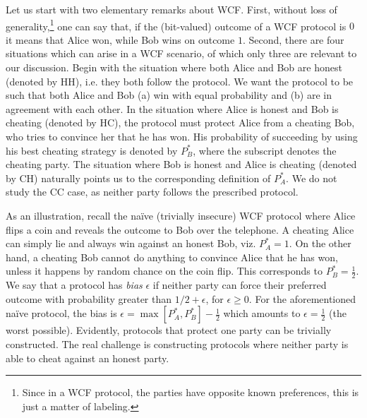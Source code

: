 \documentclass{article}
\begin{document}
Let us start with two elementary remarks about WCF.
%
First, without loss of generality,\footnote{Since in a WCF protocol, the parties have opposite known preferences, this is just a matter of labeling.} one can say that, if
the (bit-valued) outcome of a WCF protocol is $0$ %
it means that Alice won, while Bob wins on outcome $1$. Second, there are four situations which can arise
in a WCF scenario, of which only three are relevant to our discussion. %
Begin with the situation where both Alice and Bob are honest (denoted by HH),
i.e. they both follow the protocol. We want the protocol to
be such that both Alice and Bob (a) win with equal probability and
(b) are in agreement with each other. In the situation where Alice
is honest and Bob is cheating (denoted by HC), the protocol must protect Alice from
a cheating Bob, who tries to convince
her that he has won. His probability of succeeding by
using his best cheating strategy is denoted by $P_{B}^{*}$, where the subscript denotes
the cheating party. The situation
where Bob is honest and Alice is cheating (denoted by CH) naturally points us to the
corresponding definition of $P_{A}^{*}$.  We do not study the CC case, as neither party follows the prescribed protocol.

As an illustration, recall the naïve (trivially insecure) WCF protocol where Alice
flips a coin and reveals the outcome to Bob over the telephone. A cheating
Alice can simply lie and always win against an honest Bob, viz. $P_{A}^{*}=1$. On the other hand, a cheating Bob cannot do anything
to convince Alice that he has won, unless it happens by random chance
on the coin flip. This corresponds to $P_{B}^{*}=\frac{1}{2}$. We say that a protocol has \emph{bias} $\epsilon$ if neither party can force their preferred outcome with probability greater than $1/2+\epsilon$, for $\epsilon\geq 0$. For the aforementioned naïve protocol, the bias is $\epsilon=\max[P_{A}^{*},P_{B}^{*}]-\frac{1}{2}$ which
amounts to $\epsilon=\frac{1}{2}$ (the worst possible). Evidently, protocols that protect one party can be trivially constructed. The real challenge is constructing protocols where neither party is able to cheat against an honest party.
%
%
%
\end{document}
